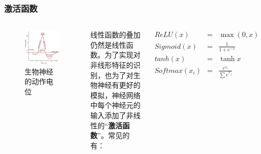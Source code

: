 \documentclass[mathserif,envcountsect,fontset=mac]{ctexbeamer}
\begin{document}
\begin{frame}
    \frametitle{激活函数}
    \begin{columns}
        \begin{figure}
            \includegraphics[width=\linewidth]{../lib/neuron.png}
            \caption{生物神经的动作电位}
        \end{figure}

        线性函数的叠加仍然是线性函数。为了实现对非线形特征的识别，也为了对生物神经有更好的模拟，神经网络中每个神经元的输入添加了非线性的“\textbf{激活函数}”。常见的有：

        \begin{eqnarray}
            ReLU(x)&=&\max(0,x)\\
            Sigmoid(x)&=&\frac {1}{1+e^{-x}}\\
            tanh(x)&=&\tanh{x}\\
            Softmax(x_i)&=&\frac{e^{x_i}}{\sum e^{x_j}}
        \end{eqnarray}

    \end{columns}
\end{frame}
\end{document}
